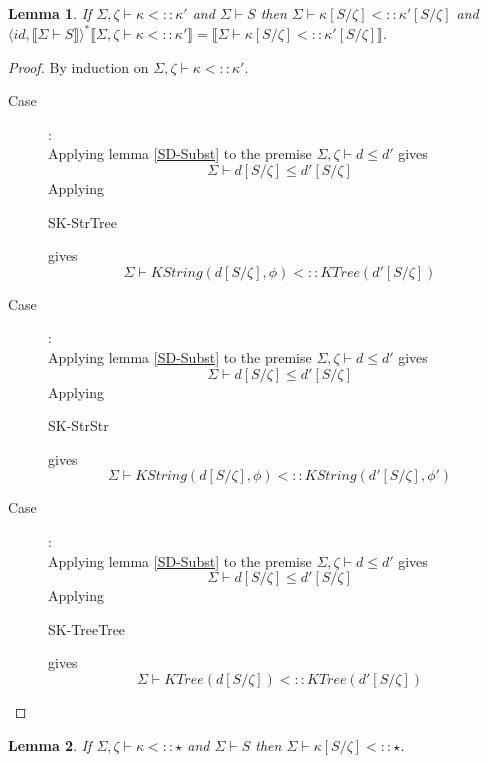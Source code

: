 \documentclass{article}
\newtheorem{lemma}{Lemma}
\newcommand{\sem}[1]{\llbracket #1 \rrbracket}
\begin{document}
\begin{lemma}
If $\Sigma,\zeta \vdash \kappa <:: \kappa'$ and $\Sigma \vdash S$ then $\Sigma \vdash \kappa[S/\zeta] <:: \kappa'[S/\zeta]$ and $\langle \mathit{id}, \sem{\Sigma \vdash S} \rangle^*\sem{\Sigma,\zeta \vdash \kappa <:: \kappa'} = \sem{\Sigma \vdash \kappa[S/\zeta] <:: \kappa'[S/\zeta]}$.
\label{SK-Subst}
\end{lemma}

\begin{proof}
By induction on $\Sigma,\zeta \vdash \kappa <:: \kappa'$.

\begin{description}
\item[Case \begin{sc}SK-StrTree\end{sc}]:~\\
Applying lemma \ref{SD-Subst} to the premise $\Sigma,\zeta \vdash d \leq d'$ gives $$\Sigma \vdash d[S/\zeta] \leq d'[S/\zeta]$$ Applying \begin{sc}SK-StrTree\end{sc} gives $$\Sigma \vdash \mathit{KString(d[S/\zeta],\phi) <:: \mathit{KTree}(d'[S/\zeta])}$$
\item[Case \begin{sc}SK-StrStr\end{sc}]:~\\
Applying lemma \ref{SD-Subst} to the premise $\Sigma,\zeta \vdash d \leq d'$ gives $$\Sigma \vdash d[S/\zeta] \leq d'[S/\zeta]$$ Applying \begin{sc}SK-StrStr\end{sc} gives $$\Sigma \vdash \mathit{KString}(d[S/\zeta],\phi) <:: \mathit{KString}(d'[S/\zeta], \phi')$$
\item[Case \begin{sc}SK-TreeTree\end{sc}]:~\\
Applying lemma \ref{SD-Subst} to the premise $\Sigma,\zeta \vdash d \leq d'$ gives $$\Sigma \vdash d[S/\zeta] \leq d'[S/\zeta]$$ Applying \begin{sc}SK-TreeTree\end{sc} gives $$\Sigma \vdash \mathit{KTree}(d[S/\zeta]) <:: \mathit{KTree}(d'[S/\zeta])$$
\end{description}
\end{proof}

\begin{lemma}
If $\Sigma,\zeta \vdash \kappa <:: \star$ and $\Sigma \vdash S$ then
$\Sigma \vdash \kappa[S/\zeta] <:: \star$.
\label{SK-Subst2}
\end{lemma}
\end{document}
